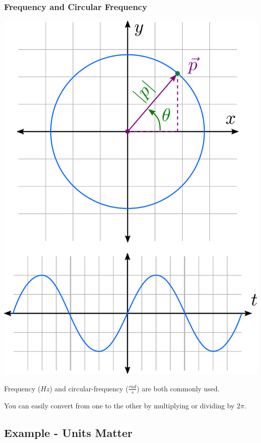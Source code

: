 \documentclass[fleqn]{beamer} %
\newcommand{\sectionIIsubsectionIIItitle}{Frequency and Circular Frequency}
\newcommand{\sectionIIsubsectionIVtitle}{Example - Units Matter}
\begin{document}
			\begin{frame}
				\frametitle{\sectionIIsubsectionIIItitle}
				\bigskip

				\begin{multicols}{2}

				\includegraphics[scale=.16]{images/circular_frequency_fig2.png}

				Frequency ($Hz$) and circular-frequency ($\frac{rad}{s}$) are both commonly used. \vspace{15mm}

				You can easily convert from one to the other by multiplying or dividing by $2\pi$.
				\end{multicols}

			\end{frame}

		\subsection{\sectionIIsubsectionIVtitle}\label{sectionIIsubsectionIV}
\end{document}

